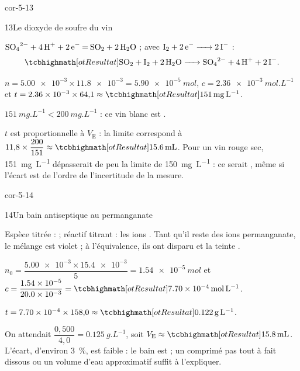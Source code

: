 \begin{blocLivre}{cor-5-13}
\begin{corrige}{13}{Le dioxyde de soufre du vin}
\begin{questions}
\item $\ce{SO4^{2-} + 4H+ + 2e- = SO2 + 2H2O}$ ; avec $\ce{I2 + 2e- -> 2I-}$ :
\[\res{\ce{SO2 + I2 + 2H2O -> SO4^{2-} + 4H+ + 2I-}}.\]
\item $n=\num{5.00e-3}\times\num{11.8e-3}=\qty{5,90e-5}{mol}$, $c=\qty{2,36e-3}{mol.L^{-1}}$ et $t=\num{2.36e-3}\times64{,}1\approx\res{\qty{151}{mg.L^{-1}}}$.
\item $\qty{151}{mg.L^{-1}}<\qty{200}{mg.L^{-1}}$ : ce vin blanc est .
\item $t$ est proportionnelle à $V_\mathrm{E}$ : la limite correspond à $11{,}8\times\dfrac{200}{151}\approx\res{\qty{15,6}{mL}}$. Pour un vin rouge sec,
\qty{151}{mg.L^{-1}} dépasserait de peu la limite de \qty{150}{mg.L^{-1}} : ce serait , même si l'écart est de l'ordre de
l'incertitude de la mesure.
\end{questions}
\end{corrige}
\end{blocLivre}
\begin{blocLivre}{cor-5-14}
\begin{corrige}{14}{Un bain antiseptique au permanganate}
\begin{questions}
\item Espèce titrée :  ; réactif titrant : les ions . Tant qu'il reste des ions permanganate, le mélange
est violet ; à l'équivalence, ils ont disparu et la teinte .
\item $n_0=\dfrac{\num{5.00e-3}\times\num{15.4e-3}}{5}=\qty{1,54e-5}{mol}$ et $c=\dfrac{\num{1.54e-5}}{\num{20.0e-3}}=\res{\qty{7,70e-4}{mol.L^{-1}}}$.
\item $t=\num{7.70e-4}\times158{,}0\approx\res{\qty{0,122}{g.L^{-1}}}$.
\item On attendait $\dfrac{0{,}500}{4{,}0}=\qty{0,125}{g.L^{-1}}$, soit $V_\mathrm{E}\approx\res{\qty{15,8}{mL}}$. L'écart, d'environ \qty{3}{\percent}, est faible : le bain est
 ; un comprimé pas tout à fait dissous ou un volume d'eau approximatif suffit à l'expliquer.
\end{questions}
\end{corrige}
\end{blocLivre}
